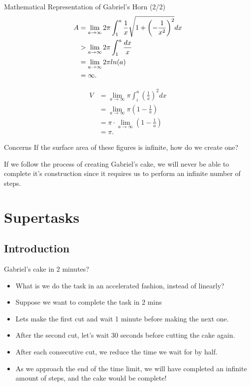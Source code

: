 \documentclass{beamer}
\begin{document}
\begin{frame}{Mathematical Representation of Gabriel's Horn (2/2)}
\begin{equation}
  \begin{split}
    A & = \lim_{a\to\infty} 2\pi \int_{1}^{a} \frac{1}{x} \sqrt{1 + \left( -\frac{1}{x^2} \right)^2} dx  \\
    & > \lim_{a\to\infty} 2\pi \int_{1}^{a} \frac{dx}{x} \\
    \vspace{3mm}
    & = \lim_{a\to\infty} 2\pi ln(a)\\
    & = \infty.
  \end{split}
\end{equation}

\begin{equation}
    \begin{split}
        V & = \lim_{a\to\infty} \pi \int_{i}^{a} \left( \frac{1}{x} \right) ^2 dx \\
        & = \lim_{a\to\infty} \pi \left(1 - \frac{1}{a} \right) \\
        & = \pi \cdot \lim_{a\to\infty} \left(1 - \frac{1}{a} \right) \\
        & = \pi.
    \end{split}
\end{equation}
\end{frame}

\begin{frame}{Concerns}
    If the surface area of these figures is infinite, how do we create one?
    
    \vspace{10mm}
    If we follow the process of creating Gabriel's cake, we will never be able to complete it's construction since it requires us to perform an infinite number of steps.
\end{frame}

\section{Supertasks}
\subsection{Introduction}
\begin{frame}{Gabriel's cake in 2 minutes?}
    \begin{itemize}
        \item What is we do the task in an accelerated fashion, instead of linearly?
        \item Suppose we want to complete the task in 2 mins
        \item Lets make the first cut and wait 1 minute before making the next one.
        \item After the second cut, let's wait 30 seconds before cutting the cake again.
        \item After each consecutive cut, we reduce the time we wait for by half.
        \item As we approach the end of the time limit, we will have completed an infinite amount of steps, and the cake would be complete!
    \end{itemize}
\end{frame}
\end{document}
